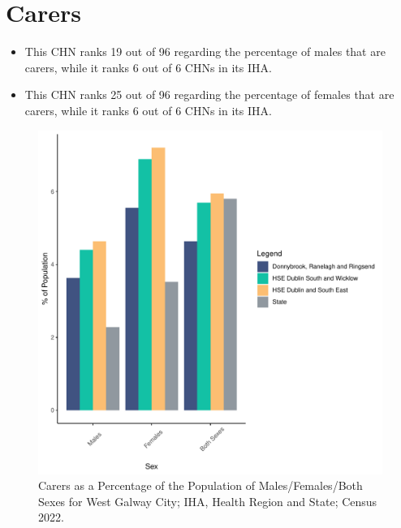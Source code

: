 \documentclass{article}
\begin{document}
\section{Carers}\label{sect:Carers}
\begin{itemize}
\item This CHN ranks  19 out of 96 regarding the percentage of males that are carers, while it ranks   6 out of 6 CHNs in its IHA.
\item This CHN ranks  25 out of 96 regarding the percentage of females that are carers, while it ranks   6 out of 6 CHNs in its IHA.
\end{itemize}
\begin{figure}[H]
	\centering
	\includegraphics[width = 150mm]{../figures/CareED.pdf}
	\caption{Carers as a Percentage of the Population of Males/Females/Both Sexes for West Galway City; IHA, Health Region and State; Census 2022.}
	\label{fig:2ae19629-1a6a-13a3-e055-000000000001}
	\end{figure}
\end{document}
